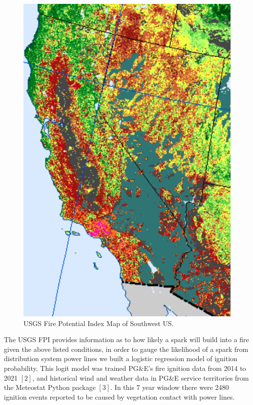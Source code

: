\documentclass{article}
\begin{document}
\begin{figure}[H]
    \centering
    \begin{minipage}{0.35\textwidth}
        \centering
        \includegraphics[width=1\textwidth]{FPI_USGS.png}
        \caption{USGS Fire Potential Index Map of Southwest US.}
    \end{minipage}
\end{figure}

The USGS FPI provides information as to how likely a spark will build into a fire given the above listed conditions, in order to gauge the likelihood of a spark from distribution system power lines we built a logistic regression model of ignition probability. This logit model was trained PG&E's fire ignition data from 2014 to 2021 $[2]$, and historical wind and weather data in PG&E service territories from the Meteostat Python package $[3]$. In this 7 year window there were 2480 ignition events reported to be caused by vegetation contact with power lines.  
\end{document}
